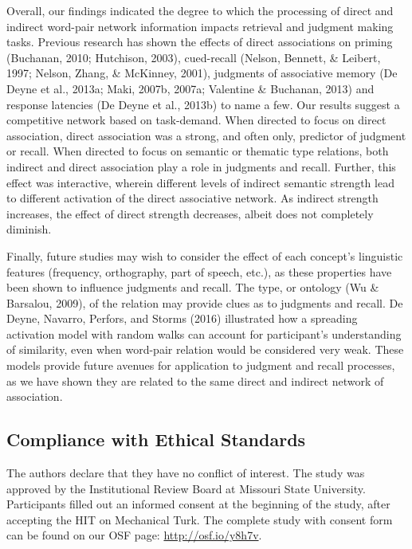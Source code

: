 \documentclass[english,,man]{apa6}
\begin{document}
Overall, our findings indicated the degree to which the processing of direct and indirect word-pair network information impacts retrieval and judgment making tasks. Previous research has shown the effects of direct associations on priming (Buchanan, 2010; Hutchison, 2003), cued-recall (Nelson, Bennett, \& Leibert, 1997; Nelson, Zhang, \& McKinney, 2001), judgments of associative memory (De Deyne et al., 2013a; Maki, 2007b, 2007a; Valentine \& Buchanan, 2013) and response latencies (De Deyne et al., 2013b) to name a few. Our results suggest a competitive network based on task-demand. When directed to focus on direct association, direct association was a strong, and often only, predictor of judgment or recall. When directed to focus on semantic or thematic type relations, both indirect and direct association play a role in judgments and recall. Further, this effect was interactive, wherein different levels of indirect semantic strength lead to different activation of the direct associative network. As indirect strength increases, the effect of direct strength decreases, albeit does not completely diminish.

Finally, future studies may wish to consider the effect of each concept's linguistic features (frequency, orthography, part of speech, etc.), as these properties have been shown to influence judgments and recall. The type, or ontology (Wu \& Barsalou, 2009), of the relation may provide clues as to judgments and recall. De Deyne, Navarro, Perfors, and Storms (2016) illustrated how a spreading activation model with random walks can account for participant's understanding of similarity, even when word-pair relation would be considered very weak. These models provide future avenues for application to judgment and recall processes, as we have shown they are related to the same direct and indirect network of association.

\hypertarget{compliance-with-ethical-standards}{%
\subsection{Compliance with Ethical Standards}\label{compliance-with-ethical-standards}}

The authors declare that they have no conflict of interest. The study was approved by the Institutional Review Board at Missouri State University. Participants filled out an informed consent at the beginning of the study, after accepting the HIT on Mechanical Turk. The complete study with consent form can be found on our OSF page: \url{http://osf.io/y8h7v}.
\end{document}
